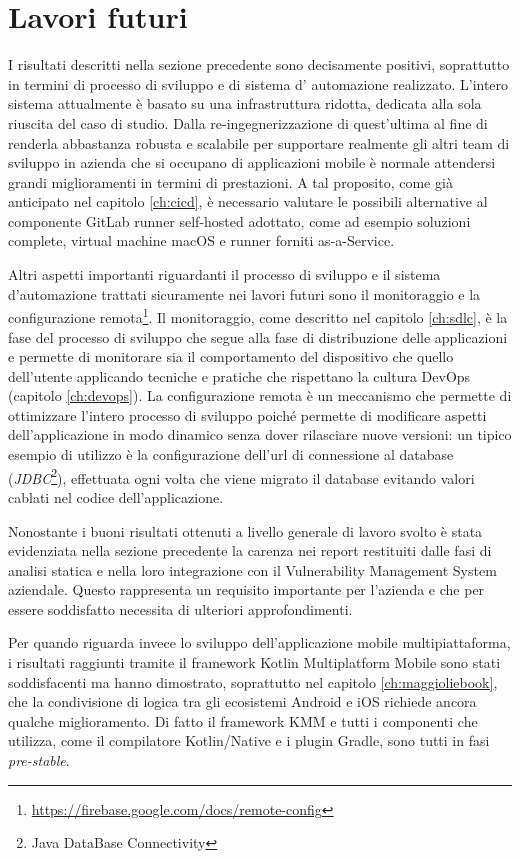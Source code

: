 \section{Lavori futuri}
I risultati descritti nella sezione precedente sono decisamente positivi, 
soprattutto in termini di processo di sviluppo e di sistema d' automazione realizzato. 
L'intero sistema attualmente è basato su una infrastruttura ridotta, 
dedicata alla sola riuscita del caso di studio. 
Dalla re-ingegnerizzazione di quest'ultima al fine di renderla abbastanza robusta e scalabile per supportare realmente gli altri team di sviluppo in azienda che si occupano di applicazioni mobile è normale attendersi grandi miglioramenti in termini di prestazioni. 
A tal proposito,
come già anticipato nel capitolo \ref{ch:cicd}, 
è necessario valutare le possibili alternative al componente GitLab runner self-hosted adottato,
come ad esempio soluzioni complete, 
virtual machine macOS e runner forniti as-a-Service.

Altri aspetti importanti riguardanti il processo di sviluppo e il sistema d'automazione trattati sicuramente nei lavori futuri sono il monitoraggio e la configurazione remota\footnote{\href{https://firebase.google.com/docs/remote-config}{https://firebase.google.com/docs/remote-config}}. 
Il monitoraggio, 
come descritto nel capitolo \ref{ch:sdlc}, 
è la fase del processo di sviluppo che segue alla fase di distribuzione delle applicazioni e permette di monitorare sia il comportamento del dispositivo che quello dell'utente applicando tecniche e pratiche che rispettano la cultura DevOps (capitolo \ref{ch:devops}).
La configurazione remota è un meccanismo che permette di ottimizzare l'intero processo di sviluppo poiché permette di modificare aspetti dell'applicazione in modo dinamico senza dover rilasciare nuove versioni: 
un tipico esempio di utilizzo è la configurazione dell'url di connessione al database (\textit{JDBC}\footnote{Java DataBase Connectivity}), 
effettuata ogni volta che viene migrato il database evitando valori cablati nel codice dell'applicazione.

Nonostante i buoni risultati ottenuti a livello generale di lavoro svolto è stata evidenziata nella sezione precedente la carenza nei report restituiti dalle fasi di analisi statica e nella loro integrazione con il Vulnerability Management System aziendale. 
Questo rappresenta un requisito importante per l'azienda e che per essere soddisfatto necessita di ulteriori approfondimenti.

Per quando riguarda invece lo sviluppo dell'applicazione mobile multipiattaforma, 
i risultati raggiunti tramite il framework Kotlin Multiplatform Mobile sono stati soddisfacenti ma hanno dimostrato, 
soprattutto nel capitolo \ref{ch:maggioliebook}, 
che la condivisione di logica tra gli ecosistemi Android e iOS richiede ancora qualche miglioramento. 
Di fatto il framework KMM e tutti i componenti che utilizza, 
come il compilatore Kotlin/Native e i plugin Gradle, 
sono tutti in fasi \textit{pre-stable}.

